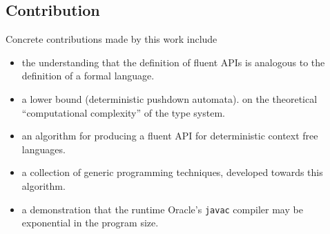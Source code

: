 \subsection{Contribution}
Concrete contributions made by this work include
\begin{itemize}
  \item the understanding that the definition of fluent APIs is analogous to 
      the definition of a formal language.
  \item a lower bound (deterministic pushdown automata). 
    on the theoretical ``computational complexity'' of the \Java type system.
  \item an algorithm for producing a fluent API for deterministic context free languages.
  \item a collection of generic programming techniques, developed towards this algorithm. 
  \item a demonstration that the runtime Oracle's \texttt{javac} compiler may be exponential in the program size. 
\end{itemize}
